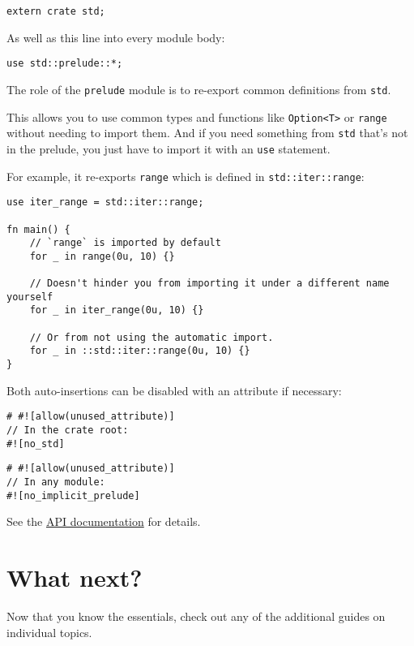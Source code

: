 \documentclass[]{article}
\begin{document}
\begin{verbatim}
extern crate std;
\end{verbatim}

As well as this line into every module body:

\begin{verbatim}
use std::prelude::*;
\end{verbatim}

The role of the \texttt{prelude} module is to re-export common
definitions from \texttt{std}.

This allows you to use common types and functions like
\texttt{Option\textless{}T\textgreater{}} or \texttt{range} without
needing to import them. And if you need something from \texttt{std}
that's not in the prelude, you just have to import it with an
\texttt{use} statement.

For example, it re-exports \texttt{range} which is defined in
\texttt{std::iter::range}:

\begin{verbatim}
use iter_range = std::iter::range;

fn main() {
    // `range` is imported by default
    for _ in range(0u, 10) {}

    // Doesn't hinder you from importing it under a different name yourself
    for _ in iter_range(0u, 10) {}

    // Or from not using the automatic import.
    for _ in ::std::iter::range(0u, 10) {}
}
\end{verbatim}

Both auto-insertions can be disabled with an attribute if necessary:

\begin{verbatim}
# #![allow(unused_attribute)]
// In the crate root:
#![no_std]
\end{verbatim}

\begin{verbatim}
# #![allow(unused_attribute)]
// In any module:
#![no_implicit_prelude]
\end{verbatim}

See the \href{std/index.html}{API documentation} for details.

\section{What next?}\label{what-next}

Now that you know the essentials, check out any of the additional guides
on individual topics.
\end{document}
